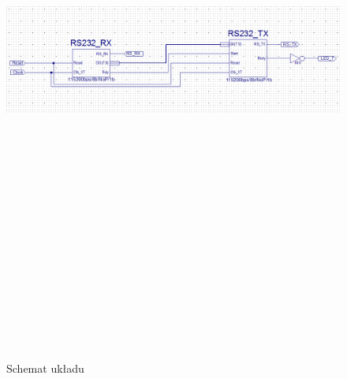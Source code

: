 \documentclass[12pt,a4paper,titlepage]{article}
\begin{document}
\begin{figure}[H]
\centering
\includegraphics[angle=90,height=20cm]{rs232.png}
\caption{Schemat układu}
\label{fig:schemat}
\end{figure}
\end{document}
